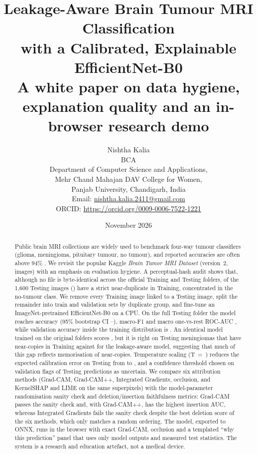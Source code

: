 \documentclass[11pt,a4paper]{article}
\title{\textbf{Leakage-Aware Brain Tumour MRI Classification\\with a Calibrated, Explainable EfficientNet-B0}\\[4pt]\large A white paper on data hygiene, explanation quality and an in-browser research demo}
\author{Nishtha Kalia\\[2pt]
\small BCA\\
\small Department of Computer Science and Applications,\\
\small Mehr Chand Mahajan DAV College for Women,\\
\small Panjab University, Chandigarh, India\\
\small Email: \href{mailto:nishtha.kalia.2411@gmail.com}{nishtha.kalia.2411@gmail.com}\\
\small ORCID: \url{https://orcid.org/0009-0006-7522-1221}}
\date{November 2026}
\begin{document}
\maketitle

\begin{abstract}
\noindent Public brain MRI collections are widely used to benchmark four-way tumour classifiers (glioma, meningioma, pituitary tumour, no tumour), and reported accuracies are often above 94\% \citep{deepak2019,swati2019,badza2020}. We revisit the popular Kaggle \emph{Brain Tumor MRI Dataset} (version~2, \DNImages{} images) with an emphasis on evaluation hygiene. A perceptual-hash audit shows that, although no file is byte-identical across the official Training and Testing folders, \DTestImgWithTrainDupStrict{} of the 1{,}600 Testing images (\StrictDupPct{}) have a strict near-duplicate in Training, concentrated in the no-tumour class. We remove every Training image linked to a Testing image, split the remainder into train and validation sets by duplicate group, and fine-tune an ImageNet-pretrained EfficientNet-B0 on a CPU. On the full Testing folder the model reaches \AccCFull{} accuracy (95\% bootstrap CI \AccLoCFull{}--\AccHiCFull{}), macro-F1 \FOneCFull{} and macro one-vs-rest ROC-AUC \AUCC{}, while validation accuracy inside the training distribution is \ValAccC{}. An identical model trained on the original folders scores \AccNFull{}, but it is right on \LBNMeningiomaDup{} Testing meningiomas that have near-copies in Training against \LBCMeningiomaDup{} for the leakage-aware model, suggesting that much of this gap reflects memorisation of near-copies. Temperature scaling (T~=~\TempC{}) reduces the expected calibration error on Testing from \ECERawC{} to \ECECalC{}, and a confidence threshold chosen on validation flags \UncRateC{} of Testing predictions as uncertain. We compare six attribution methods (Grad-CAM, Grad-CAM++, Integrated Gradients, occlusion, and KernelSHAP and LIME on the same superpixels) with the model-parameter randomisation sanity check and deletion/insertion faithfulness metrics: Grad-CAM passes the sanity check and, with Grad-CAM++, has the highest insertion AUC, whereas Integrated Gradients fails the sanity check despite the best deletion score of the six methods, which only matches a random ordering. The model, exported to ONNX, runs in the browser with exact Grad-CAM, occlusion and a templated ``why this prediction'' panel that uses only model outputs and measured test statistics. The system is a research and education artefact, not a medical device.
\end{abstract}
\end{document}
